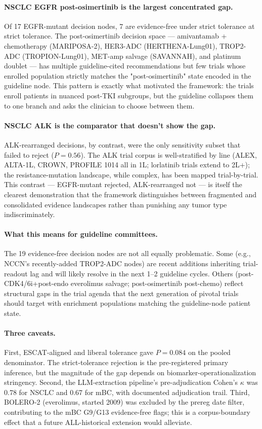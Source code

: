 \documentclass[11pt,a4paper]{article}
\begin{document}
\paragraph{NSCLC EGFR post-osimertinib is the largest concentrated gap.}
Of 17 EGFR-mutant decision nodes, 7 are evidence-free under strict tolerance at strict tolerance. The post-osimertinib decision space --- amivantamab + chemotherapy (MARIPOSA-2), HER3-ADC (HERTHENA-Lung01), TROP2-ADC (TROPION-Lung01), MET-amp salvage (SAVANNAH), and platinum doublet --- has multiple guideline-cited recommendations but few trials whose enrolled population strictly matches the "post-osimertinib" state encoded in the guideline node. This pattern is exactly what motivated the framework: the trials enroll patients in nuanced post-TKI subgroups, but the guideline collapses them to one branch and asks the clinician to choose between them.

\paragraph{NSCLC ALK is the comparator that doesn't show the gap.}
ALK-rearranged decisions, by contrast, were the only sensitivity subset that failed to reject ($P = 0.56$). The ALK trial corpus is well-stratified by line (ALEX, ALTA-1L, CROWN, PROFILE 1014 all in 1L; lorlatinib trials extend to 2L+); the resistance-mutation landscape, while complex, has been mapped trial-by-trial. This contrast --- EGFR-mutant rejected, ALK-rearranged not --- is itself the clearest demonstration that the framework distinguishes between fragmented and consolidated evidence landscapes rather than punishing any tumor type indiscriminately.

\paragraph{What this means for guideline committees.}
The 19 evidence-free decision nodes are not all equally problematic. Some (e.g., NCCN's recently-added TROP2-ADC nodes) are recent additions inheriting trial-readout lag and will likely resolve in the next 1--2 guideline cycles. Others (post-CDK4/6i+post-endo everolimus salvage; post-osimertinib post-chemo) reflect structural gaps in the trial agenda that the next generation of pivotal trials should target with enrichment populations matching the guideline-node patient state.

\paragraph{Three caveats.}
First, ESCAT-aligned and liberal tolerance gave $P = 0.084$ on the pooled denominator. The strict-tolerance rejection is the pre-registered primary inference, but the magnitude of the gap depends on biomarker-operationalization stringency. Second, the LLM-extraction pipeline's pre-adjudication Cohen's $\kappa$ was 0.78 for NSCLC and 0.67 for mBC, with documented adjudication trail. Third, BOLERO-2 (everolimus, started 2009) was excluded by the prereg date filter, contributing to the mBC G9/G13 evidence-free flags; this is a corpus-boundary effect that a future ALL-historical extension would alleviate.
\end{document}
